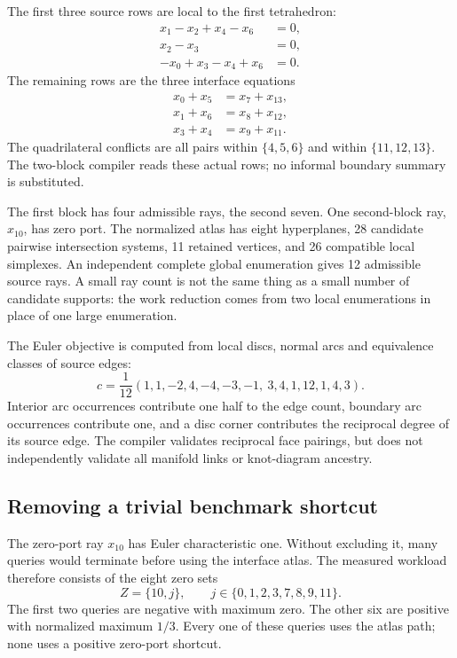 \documentclass[11pt,a4paper]{article}
\theoremstyle{definition}
\theoremstyle{remark}
\begin{document}
The first three source rows are local to the first tetrahedron:
\begin{align*}
 x_1-x_2+x_4-x_6&=0,\\
 x_2-x_3&=0,\\
 -x_0+x_3-x_4+x_6&=0.
\end{align*}
The remaining rows are the three interface equations
\begin{align}
 x_0+x_5&=x_7+x_{13},\nonumber\\
 x_1+x_6&=x_8+x_{12},\label{eq:fixture-ports}\\
 x_3+x_4&=x_9+x_{11}.\nonumber
\end{align}
The quadrilateral conflicts are all pairs within $\{4,5,6\}$ and within $\{11,12,13\}$. The two-block compiler reads these actual rows; no informal boundary summary is substituted.

The first block has four admissible rays, the second seven. One second-block ray, $x_{10}$, has zero port. The normalized atlas has eight hyperplanes, 28 candidate pairwise intersection systems, 11 retained vertices, and 26 compatible local simplexes. An independent complete global enumeration gives 12 admissible source rays. A small ray count is not the same thing as a small number of candidate supports: the work reduction comes from two local enumerations in place of one large enumeration.

The Euler objective is computed from local discs, normal arcs and equivalence classes of source edges:
\begin{equation}
 c=\frac1{12}(1,1,-2,4,-4,-3,-1,\ 3,4,1,12,1,4,3).
 \label{eq:fixture-euler}
\end{equation}
Interior arc occurrences contribute one half to the edge count, boundary arc occurrences contribute one, and a disc corner contributes the reciprocal degree of its source edge. The compiler validates reciprocal face pairings, but does not independently validate all manifold links or knot-diagram ancestry.

\subsection{Removing a trivial benchmark shortcut}
The zero-port ray $x_{10}$ has Euler characteristic one. Without excluding it, many queries would terminate before using the interface atlas. The measured workload therefore consists of the eight zero sets
\[
 Z=\{10,j\},\qquad j\in\{0,1,2,3,7,8,9,11\}.
\]
The first two queries are negative with maximum zero. The other six are positive with normalized maximum $1/3$. Every one of these queries uses the atlas path; none uses a positive zero-port shortcut.
\end{document}
